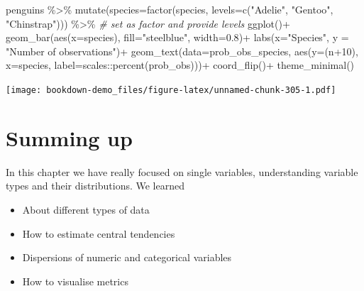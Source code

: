 \documentclass[
]{book}
\newenvironment{Shaded}{\begin{snugshade}}{\end{snugshade}}
\newcommand{\AttributeTok}[1]{\textcolor[rgb]{0.77,0.63,0.00}{#1}}
\newcommand{\CommentTok}[1]{\textcolor[rgb]{0.56,0.35,0.01}{\textit{#1}}}
\newcommand{\DecValTok}[1]{\textcolor[rgb]{0.00,0.00,0.81}{#1}}
\newcommand{\FloatTok}[1]{\textcolor[rgb]{0.00,0.00,0.81}{#1}}
\newcommand{\FunctionTok}[1]{\textcolor[rgb]{0.00,0.00,0.00}{#1}}
\newcommand{\NormalTok}[1]{#1}
\newcommand{\SpecialCharTok}[1]{\textcolor[rgb]{0.00,0.00,0.00}{#1}}
\newcommand{\StringTok}[1]{\textcolor[rgb]{0.31,0.60,0.02}{#1}}
\begin{document}
\begin{Shaded}
\begin{Highlighting}[]
\NormalTok{penguins }\SpecialCharTok{\%\textgreater{}\%} 
  \FunctionTok{mutate}\NormalTok{(}\AttributeTok{species=}\FunctionTok{factor}\NormalTok{(species, }\AttributeTok{levels=}\FunctionTok{c}\NormalTok{(}\StringTok{"Adelie"}\NormalTok{,}
                                          \StringTok{"Gentoo"}\NormalTok{,}
                                          \StringTok{"Chinstrap"}\NormalTok{))) }\SpecialCharTok{\%\textgreater{}\%} \CommentTok{\# set as factor and provide levels}
  \FunctionTok{ggplot}\NormalTok{()}\SpecialCharTok{+}
  \FunctionTok{geom\_bar}\NormalTok{(}\FunctionTok{aes}\NormalTok{(}\AttributeTok{x=}\NormalTok{species),}
           \AttributeTok{fill=}\StringTok{"steelblue"}\NormalTok{,}
           \AttributeTok{width=}\FloatTok{0.8}\NormalTok{)}\SpecialCharTok{+}
  \FunctionTok{labs}\NormalTok{(}\AttributeTok{x=}\StringTok{"Species"}\NormalTok{,}
       \AttributeTok{y =} \StringTok{"Number of observations"}\NormalTok{)}\SpecialCharTok{+}
  \FunctionTok{geom\_text}\NormalTok{(}\AttributeTok{data=}\NormalTok{prob\_obs\_species,}
            \FunctionTok{aes}\NormalTok{(}\AttributeTok{y=}\NormalTok{(n}\SpecialCharTok{+}\DecValTok{10}\NormalTok{),}
                \AttributeTok{x=}\NormalTok{species,}
                \AttributeTok{label=}\NormalTok{scales}\SpecialCharTok{::}\FunctionTok{percent}\NormalTok{(prob\_obs)))}\SpecialCharTok{+}
  \FunctionTok{coord\_flip}\NormalTok{()}\SpecialCharTok{+}
  \FunctionTok{theme\_minimal}\NormalTok{()}
\end{Highlighting}
\end{Shaded}

\texttt{[image: bookdown-demo\_files/figure-latex/unnamed-chunk-305-1.pdf]}

\hypertarget{summing-up-2}{%
\section{Summing up}\label{summing-up-2}}

In this chapter we have really focused on single variables, understanding variable types and their distributions. We learned

\begin{itemize}
\item
  About different types of data
\item
  How to estimate central tendencies
\item
  Dispersions of numeric and categorical variables
\item
  How to visualise metrics
\end{itemize}
\end{document}
